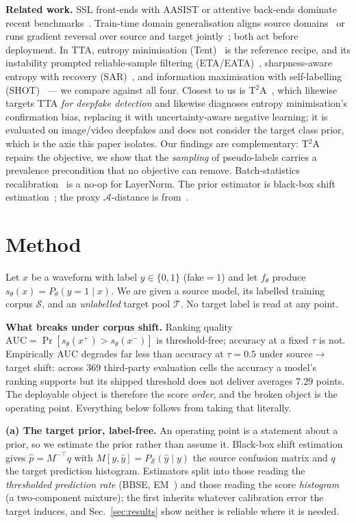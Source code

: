 \documentclass[conference]{IEEEtran}
\begin{document}
\textbf{Related work.} SSL front-ends with AASIST or attentive back-ends dominate
recent benchmarks~\cite{wav2vec2aug,xlsrsls,aasist,rawnet2}. Train-time domain
generalisation aligns source domains~\cite{asdg} or runs gradient reversal over
source and target jointly~\cite{dann}; both act before deployment. In TTA,
entropy minimisation (Tent)~\cite{tent} is the reference recipe, and its
instability prompted reliable-sample filtering (ETA/EATA)~\cite{eata},
sharpness-aware entropy with recovery (SAR)~\cite{sar}, and information maximisation with
self-labelling (SHOT)~\cite{shot} --- we compare against all four. Closest to us
is T$^2$A~\cite{t2a}, which likewise targets TTA \emph{for deepfake detection}
and likewise diagnoses entropy minimisation's confirmation bias, replacing it
with uncertainty-aware negative learning; it is evaluated on image/video
deepfakes and does not consider the target class prior, which is the axis this
paper isolates. Our findings are complementary: T$^2$A repairs the objective,
we show that the \emph{sampling} of pseudo-labels carries a prevalence
precondition that no objective can remove. Batch-statistics recalibration~\cite{adabn} is a no-op for LayerNorm. The
prior estimator is black-box shift estimation~\cite{bbse}; the proxy
$\mathcal{A}$-distance is from~\cite{bendavid}.

\section{Method}
\label{sec:method}
Let $x$ be a waveform with label $y\in\{0,1\}$ (fake$=1$) and let $f_\theta$
produce $s_\theta(x)=P_\theta(y{=}1\mid x)$. We are given a source model, its
labelled training corpus $\mathcal{S}$, and an \emph{unlabelled} target pool
$\mathcal{T}$. No target label is read at any point.

\textbf{What breaks under corpus shift.} Ranking quality
$\mathrm{AUC}=\Pr[s_\theta(x^+){>}s_\theta(x^-)]$ is threshold-free; accuracy at
a fixed $\tau$ is not. Empirically AUC degrades far less than accuracy at
$\tau{=}0.5$ under source$\to$target shift: across $369$ third-party evaluation
cells the accuracy a model's ranking supports but its shipped threshold does not
deliver averages $7.29$ points. The deployable object is therefore the score
\emph{order}, and the broken object is the operating point. Everything below follows from taking that literally.

\textbf{(a) The target prior, label-free.} An operating point is a statement
about a prior, so we estimate the prior rather than assume it. Black-box shift
estimation~\cite{bbse} gives $\hat p = M^{-\top}q$ with
$M[y,\hat y]=P_{\mathcal S}(\hat y\mid y)$ the source confusion matrix and $q$ the
target prediction histogram. Estimators split into those reading the
\emph{thresholded prediction rate} (BBSE, EM~\cite{sld}) and those reading the
score \emph{histogram} (a two-component mixture); the first inherits whatever
calibration error the target induces, and Sec.~\ref{sec:results} show neither is reliable where it is needed.
\end{document}
